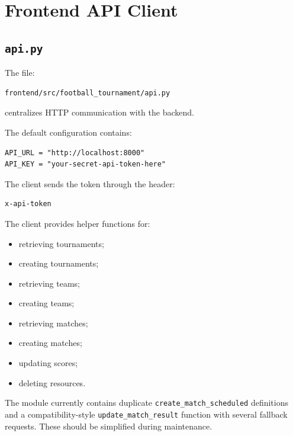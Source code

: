 \documentclass[12pt,a4paper]{article}
\begin{document}
\section{Frontend API Client}

\subsection{\texttt{api.py}}

The file:

\begin{lstlisting}
frontend/src/football_tournament/api.py
\end{lstlisting}

centralizes HTTP communication with the backend.

The default configuration contains:

\begin{lstlisting}
API_URL = "http://localhost:8000"
API_KEY = "your-secret-api-token-here"
\end{lstlisting}

The client sends the token through the header:

\begin{lstlisting}
x-api-token
\end{lstlisting}

The client provides helper functions for:

\begin{itemize}
    \item retrieving tournaments;
    \item creating tournaments;
    \item retrieving teams;
    \item creating teams;
    \item retrieving matches;
    \item creating matches;
    \item updating scores;
    \item deleting resources.
\end{itemize}

The module currently contains duplicate
\texttt{create\_match\_scheduled} definitions and a compatibility-style
\texttt{update\_match\_result} function with several fallback requests.
These should be simplified during maintenance.

\end{document}
